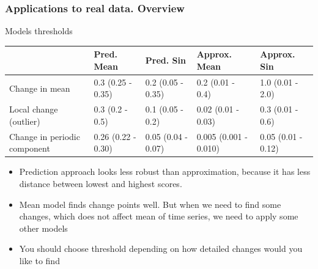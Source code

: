 \documentclass[intlimits, 9pt, unicode]{beamer}
\begin{document}
\begin{frame}
    \frametitle{Applications to real data. Overview}

\begin{table}
\centering
Models thresholds
\begin{tabular}[t]{|p{8em}|p{5em}|p{5em}|p{5em}|p{5em}|}
\hline
  & Pred. Mean & Pred. Sin & Approx. Mean & Approx. Sin\\
\hline
Change in mean & 0.3 (0.25 - 0.35) & 0.2 (0.05 - 0.35) & 0.2 (0.01 - 0.4) & 1.0 (0.01 - 2.0)\\
\hline
Local change (outlier) & 0.3 (0.2 - 0.5) & 0.1 (0.05 - 0.2) & 0.02 (0.01 - 0.03) & 0.3 (0.01 - 0.6)\\
\hline
Change in periodic component & 0.26 (0.22 - 0.30) & 0.05 (0.04 - 0.07) & 0.005 (0.001 - 0.010) & 0.05 (0.01 - 0.12)\\
\hline
\end{tabular}
\end{table}

\begin{itemize}
	\item Prediction approach looks less robust than approximation, because it has less distance between lowest and highest scores.
	\item Mean model finds change points well. But when we need to find some changes, which does not affect mean of time series, we need to apply some other models
	\item You should choose threshold depending on how detailed changes would you like to find
\end{itemize}

\end{frame}
\end{document}
